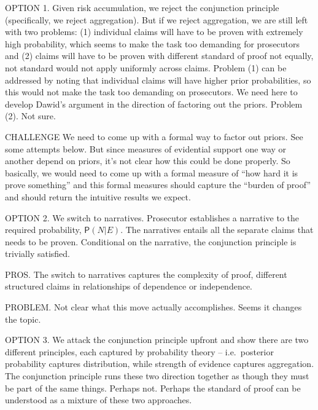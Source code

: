 \documentclass[
  10pt,
  dvipsnames,enabledeprecatedfontcommands]{scrartcl}
\newcommand{\pr}[1]{\mathsf{P}(#1)}
\begin{document}
OPTION 1. Given risk accumulation, we reject the conjunction principle
(specifically, we reject aggregation). But if we reject aggregation, we
are still left with two problems: (1) individual claims will have to be
proven with extremely high probability, which seems to make the task too
demanding for prosecutors and (2) claims will have to be proven with
different standard of proof not equally, not standard would not apply
uniformly across claims. Problem (1) can be addressed by noting that
individual claims will have higher prior probabilities, so this would
not make the task too demanding on prosecutors. We need here to develop
Dawid's argument in the direction of factoring out the priors. Problem
(2). Not sure.

CHALLENGE We need to come up with a formal way to factor out priors. See
some attempts below. But since measures of evidential support one way or
another depend on priors, it's not clear how this could be done
properly. So basically, we would need to come up with a formal measure
of ``how hard it is prove something'' and this formal measures should
capture the ``burden of proof'' and should return the intuitive results
we expect.

OPTION 2. We switch to narratives. Prosecutor establishes a narrative to
the required probability, \(\pr{N \vert E}\). The narratives entails all
the separate claims that needs to be proven. Conditional on the
narrative, the conjunction principle is trivially satisfied.

PROS. The switch to narratives captures the complexity of proof,
different structured claims in relationships of dependence or
independence.

PROBLEM. Not clear what this move actually accomplishes. Seems it
changes the topic.

OPTION 3. We attack the conjunction principle upfront and show there are
two different principles, each captured by probability theory --
i.e.~posterior probability captures distribution, while strength of
evidence captures aggregation. The conjunction principle runs these two
direction together as though they must be part of the same things.
Perhaps not. Perhaps the standard of proof can be understood as a
mixture of these two approaches.
\end{document}
